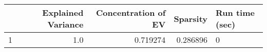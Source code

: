 \begin{tabular}{lrrrl}
\toprule
{} &  Explained Variance &  Concentration of EV &  Sparsity & Run time (sec) \\
\midrule
1 &                 1.0 &             0.719274 &  0.286896 &              0 \\
\bottomrule
\end{tabular}

